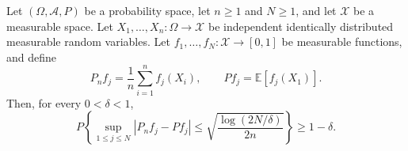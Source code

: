 \begin{theorem}
Let $(\Omega,\mathcal A,P)$ be a probability space, let $n\ge 1$ and
$N\ge 1$, and let $\mathcal X$ be a measurable space.  Let
$X_1,\ldots,X_n:\Omega\to\mathcal X$ be independent identically
distributed measurable random variables.  Let
$f_1,\ldots,f_N:\mathcal X\to[0,1]$ be measurable functions, and define
\[
  P_n f_j=\frac1n\sum_{i=1}^n f_j(X_i),
  \qquad
  P f_j=\mathbb E[f_j(X_1)].
\]
Then, for every $0<\delta<1$,
\[
  P\!\left\{
    \sup_{1\le j\le N}|P_n f_j-P f_j|
    \le \sqrt{\frac{\log(2N/\delta)}{2n}}
  \right\}\ge 1-\delta.
\]
\end{theorem}
